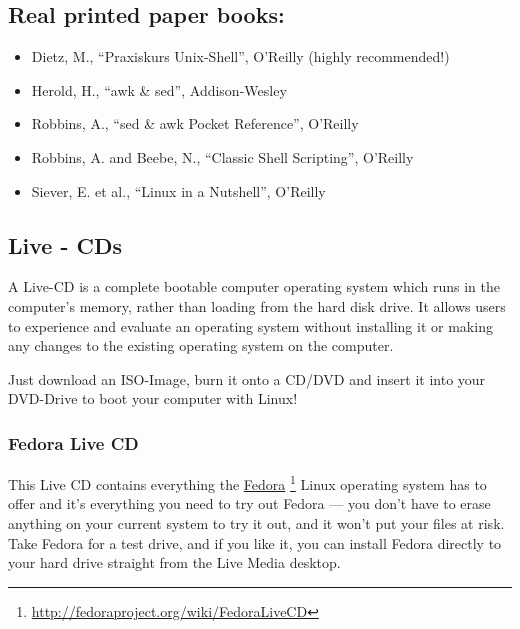 \documentclass[a4paper,11pt,english]{sphinxmanual}
\begin{document}
\subsection{Real printed paper books:}
\label{ReadingList:real-printed-paper-books}\begin{itemize}
\item {} 
Dietz, M., ``Praxiskurs Unix-Shell'', O'Reilly (highly recommended!)

\item {} 
Herold, H., ``awk \& sed'', Addison-Wesley

\item {} 
Robbins, A., ``sed \& awk Pocket Reference'', O'Reilly

\item {} 
Robbins, A. and Beebe, N., ``Classic Shell Scripting'', O'Reilly

\item {} 
Siever, E. et al., ``Linux in a Nutshell'', O'Reilly

\end{itemize}


\subsection{Live - CDs}
\label{ReadingList:live-cds}
A Live-CD is a complete bootable computer operating system which runs in the computer's
memory, rather than loading from the hard disk drive. It allows users to experience and evaluate an
operating system without installing it or making any changes to the existing operating system on the
computer.

Just download an ISO-Image, burn it onto a CD/DVD and insert it into your DVD-Drive to boot
your computer with Linux!


\subsubsection{Fedora Live CD}
\label{ReadingList:fedora-live-cd}
This Live CD contains everything the \href{http://fedoraproject.org/wiki/FedoraLiveCD}{Fedora} \footnote{
\href{http://fedoraproject.org/wiki/FedoraLiveCD}{http://fedoraproject.org/wiki/FedoraLiveCD}
} Linux operating system has to offer and it's everything
you need to try out Fedora — you don't have to erase anything on your current system to try it out,
and it won't put your files at risk. Take Fedora for a test drive, and if you like it, you can install
Fedora directly to your hard drive straight from the Live Media desktop.
\end{document}
